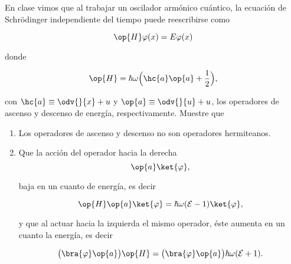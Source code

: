 \documentclass[../main.tex]{subfiles}
\begin{document}
\begin{problema}
	En clase vimos que al trabajar un oscilador armónico cuántico, la ecuación de
	Schrödinger independiente del tiempo puede reescribirse como

	\begin{equation*}
		\op{H}\varphi(x) = E\varphi(x)
	\end{equation*}

	donde

	\begin{equation*}
		\op{H} = \hbar\omega \Bigl(\hc{a}\op{a} + \dfrac{1}{2}\Bigr),
	\end{equation*}

	con \(\hc{a} \equiv \odv{}{x} + u\) y \( \op{a} \equiv \odv{}{u} + u\), los
	operadores de ascenso y descenso de energía, respectivamente. Muestre que

	\begin{enumerate}
		\item Los operadores de ascenso y descenso no son operadores hermiteanos.
		\item Que la acción del operador hacia la derecha
		      \begin{equation*}
			      \op{a} \ket{\varphi},
		      \end{equation*}

		      baja en un cuanto de energía, es decir

		      \begin{equation*}
			      \op{H}\op{a}\ket{\varphi} = \hbar\omega(\mathcal{E} - 1)\ket{\varphi},
		      \end{equation*}

		      y que al actuar hacia la izquierda el mismo operador, éste aumenta en un
		      cuanto la energía, es decir

		      \begin{equation}
			      \bigl(\bra{\varphi}\op{a}\bigr)\op{H} = \bigl(\bra{\varphi}\op{a}\bigr)\hbar\omega(\mathcal{E} + 1).
		      \end{equation}
	\end{enumerate}
\end{problema}
\end{document}
